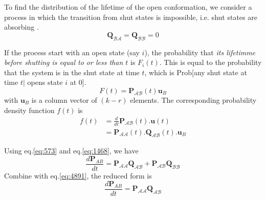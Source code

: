 To find the distribution of the lifetime of the open conformation, we
consider a process in which the transition from shut states is
impossible, i.e.
shut states are absorbing \citep{colquhoun1977rfm}.
\begin{equation}
\label{eq:4891}
\mathbf{Q}_{\mathcal{BA}}=\mathbf{Q}_{\mathcal{BB}}=0
\end{equation}

If the process start with an open state (say $i$), the probability that {\it its
lifetimme before shutting is equal to or less than $t$} is $F_i(t)$. This is equal to the
probability that the system is in the shut state at time $t$, which is Prob[any
shut state at time $t |$ opens state $i$ at 0].
\begin{equation}
F(t) = \mathbf{P}_{\mathcal{AB}}(t)\mathbf{u}_B
\end{equation}
with $\mathbf{u}_B$ is a column vector of $(k-r)$ elements. The corresponding
probability density function $f(t)$ is
\begin{equation}
\begin{split}
f(t) &= \frac{d}{dt}\mathbf{P}_\mathcal{AB}(t).\mathbf{u}(t) \\
   &= \mathbf{P}_{\mathcal{AA}}(t).\mathbf{Q}_{\mathcal{AB}}(t).\mathbf{u}_B
\end{split}
\end{equation}

\begin{framed}
Using eq.\ref{eq:573} and eq.\ref{eq:1468}, we have
\begin{equation}
\frac{d\mathbf{P}_{AB}}{dt}=\mathbf{P}_\mathcal{AA}\mathbf{Q}_\mathcal{AB}+\mathbf{P}_\mathcal{AB}\mathbf{Q}_\mathcal{BB}
\end{equation}
Combine with eq.\ref{eq:4891}, the reduced form is
\begin{equation}
\frac{d\mathbf{P}_{AB}}{dt}=\mathbf{P}_\mathcal{AA}\mathbf{Q}_\mathcal{AB}
\end{equation}
\end{framed}

